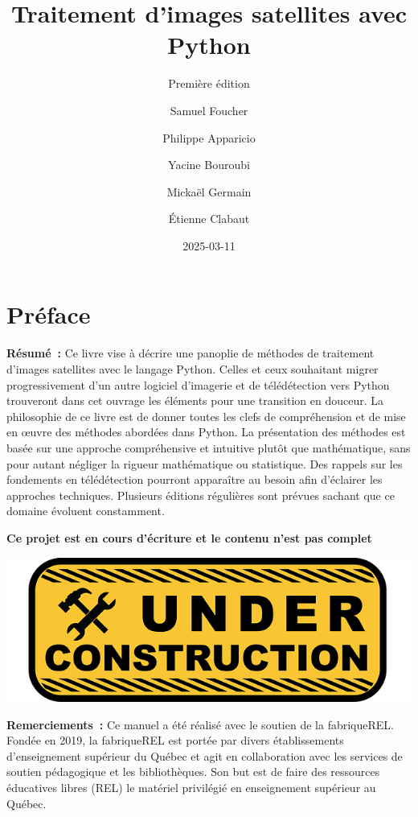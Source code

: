 \documentclass[
  11pt,
  letterpaper,
  open=any,
  twoside=false,
  french]{scrbook}
\title{Traitement d'images satellites avec Python}
\subtitle{Première édition}
\author{Samuel Foucher \and Philippe Apparicio \and Yacine
Bouroubi \and Mickaël Germain \and Étienne Clabaut}
\date{2025-03-11}
\renewcommand*\contentsname{Table des matières}
\newcommand\contentsname{Table des matières}
\begin{document}
\frontmatter
\maketitle

\renewcommand*\contentsname{Table des matières}
{
\hypersetup{linkcolor=}
\setcounter{tocdepth}{2}
\tableofcontents
}
\listoffigures
\listoftables

\mainmatter
{}

\chapter*{Préface}\label{pruxe9face}


\renewcommand{\partname}{} %

\textbf{Résumé~:} Ce livre vise à décrire une panoplie de méthodes de
traitement d'images satellites avec le langage Python. Celles et ceux
souhaitant migrer progressivement d'un autre logiciel d'imagerie et de
télédétection vers Python trouveront dans cet ouvrage les éléments pour
une transition en douceur. La philosophie de ce livre est de donner
toutes les clefs de compréhension et de mise en œuvre des méthodes
abordées dans Python. La présentation des méthodes est basée sur une
approche compréhensive et intuitive plutôt que mathématique, sans pour
autant négliger la rigueur mathématique ou statistique. Des rappels sur
les fondements en télédétection pourront apparaître au besoin afin
d'éclairer les approches techniques. Plusieurs éditions régulières sont
prévues sachant que ce domaine évoluent constamment.

\textbf{Ce projet est en cours d'écriture et le contenu n'est pas
complet}

\includegraphics[width=0.5\linewidth,height=\textheight,keepaspectratio]{images/logos/under-construction-2408062_640.png}\hfill

\textbf{Remerciements~:} Ce manuel a été réalisé avec le soutien de la
fabriqueREL. Fondée en 2019, la fabriqueREL est portée par divers
établissements d'enseignement supérieur du Québec et agit en
collaboration avec les services de soutien pédagogique et les
bibliothèques. Son but est de faire des ressources éducatives libres
(REL) le matériel privilégié en enseignement supérieur au Québec.
\end{document}
